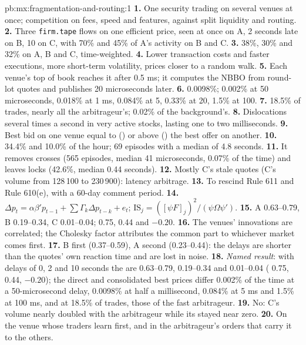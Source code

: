 \begin{solution}{pb:mx:fragmentation-and-routing:1}
\textbf{1.} One security trading on several venues at once; competition on fees, speed and features, against split liquidity and routing.
\textbf{2.} Three \texttt{firm.tape} flows on one efficient price, seen at once on A, 2 seconds late on B, 10 on C, with 70\% and 45\% of A's activity on B
and C.
\textbf{3.} 38\%, 30\% and 32\% on A, B and C, time-weighted.
\textbf{4.} Lower transaction costs and faster executions, more short-term volatility, prices closer to a random walk.
\textbf{5.} Each venue's top of book reaches it after 0.5 ms; it computes the NBBO from round-lot quotes and publishes 20 microseconds later.
\textbf{6.} 0.0098\%; 0.002\% at 50 microseconds, 0.018\% at 1 ms, 0.084\% at 5, 0.33\% at 20, 1.5\% at 100.
\textbf{7.} 18.5\% of trades, nearly all the arbitrageur's; 0.02\% of the background's.
\textbf{8.} Dislocations several times a second in very active stocks, lasting one to two milliseconds.
\textbf{9.} Best bid on one venue equal to () or above () the best offer on another.
\textbf{10.}  34.4\% and  10.0\% of the hour; 69  episodes with a median of 4.8 seconds.
\textbf{11.} It removes crosses (565 episodes, median 41 microseconds, 0.07\% of the time) and leaves locks (42.6\%, median 0.44 seconds).
\textbf{12.} Mostly C's stale quotes (C's volume from 128\,100 to 230\,900): latency arbitrage.
\textbf{13.} To rescind Rule 611 and Rule 610(e), with a 60-day comment period.
\textbf{14.} $\Delta p_t=\alpha\beta'p_{t-1}+\sum\Gamma_k\Delta p_{t-k}+e_t$; $\mathrm{IS}_j=([\psi F]_j)^2/(\psi\Omega\psi')$.
\textbf{15.} A 0.63--0.79, B 0.19--0.34, C 0.01--0.04;  0.75, 0.44 and $-0.20$.
\textbf{16.} The venues' innovations are correlated; the Cholesky factor attributes the common part to whichever market comes first.
\textbf{17.} B first (0.37--0.59), A second (0.23--0.44): the delays are shorter than the quotes' own reaction time and are lost in noise.
\textbf{18.} \emph{Named result}: with delays of 0, 2 and 10 seconds the  are 0.63--0.79, 0.19--0.34 and 0.01--0.04 (
0.75, 0.44, $-0.20$); the direct and consolidated best prices differ 0.002\% of the time at a 50-microsecond delay, 0.0098\% at half a millisecond,
0.084\% at 5 ms and 1.5\% at 100 ms, and at 18.5\% of trades, those of the fast arbitrageur.
\textbf{19.} No: C's volume nearly doubled with the arbitrageur while its  stayed near zero.
\textbf{20.} On the venue whose traders learn first, and in the arbitrageur's orders that carry it to the others.
\end{solution}

